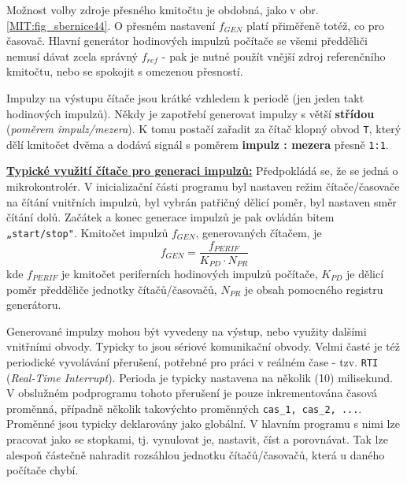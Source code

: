         Možnost volby zdroje přesného kmitočtu je obdobná, jako v obr. \ref{MIT:fig_sbernice44}. O 
        přesném nastavení \(f_{GEN}\) platí přiměřeně totéž, co pro časovač. Hlavní generátor 
        hodinových impulzů počítače se všemi předděliči nemusí dávat zcela správný \(f_{ref}\) - 
        pak je nutné použít vnější zdroj referenčního kmitočtu, nebo se spokojit s omezenou 
        přesností.
        
        Impulzy na výstupu čítače jsou krátké vzhledem k periodě (jen jeden takt hodinových 
        impulzů). Někdy je zapotřebí generovat impulzy s větší \textbf{střídou} (\emph{poměrem 
        impulz/mezera}). K tomu postačí zařadit za čítač klopný obvod \texttt{T}, který dělí 
        kmitočet dvěma a dodává signál s poměrem \textbf{impulz : mezera} přesně \texttt{1:1}.
        
        \underline{\textbf{Typické využití čítače pro generaci impulzů:}}
        Předpokládá se, že se jedná o mikrokontrolér. V inicializační části programu byl nastaven 
        režim čítače/časovače na čítání vnitřních impulzů, byl vybrán patřičný dělicí poměr, byl 
        nastaven směr čítání dolů. Začátek a konec generace impulzů je pak ovládán bitem 
        \texttt{„start/stop"}. Kmitočet impulzů \(f_{GEN}\), generovaných čítačem, je
        \begin{equation}
          f_{GEN} = \frac{f_{PERIF}}{K_{PD} \cdot N_{PR}}
        \end{equation}         
        kde \(f_{PERIF}\) je kmitočet periferních hodinových impulzů počítače, \(K_{PD}\) je dělicí 
        poměr předděliče jednotky čítačů/časovačů, \(N_{PR}\) je obsah pomocného registru 
        generátoru.
        
        Generované impulzy mohou být vyvedeny na výstup, nebo využity dalšími vnitřními obvody. 
        Typicky to jsou sériové komunikační obvody. Velmi časté je též periodické vyvolávání 
        přerušení, potřebné pro práci v reálném čase - tzv. \texttt{RTI} (\emph{Real-Time 
        Interrupt}). Perioda je typicky nastavena na několik (10) milisekund. V obslužném 
        podprogramu tohoto přerušení je pouze inkrementována časová proměnná, případně několik 
        takovýchto proměnných \texttt{cas\_1, cas\_2, ...}. Proměnné jsou typicky 
        deklarovány jako globální. V hlavním programu s nimi lze pracovat jako se stopkami, tj. 
        vynulovat je, nastavit, číst a porovnávat. Tak lze alespoň částečně nahradit rozsáhlou 
        jednotku čítačů/časovačů, která u daného počítače chybí.
        
